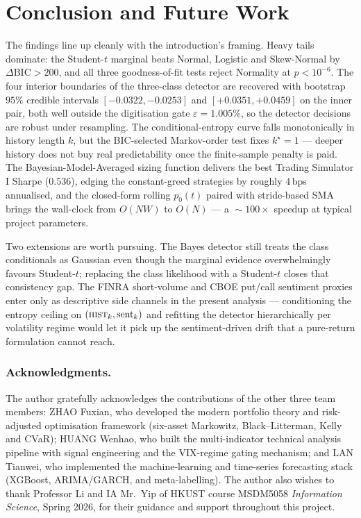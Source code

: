 \documentclass[runningheads]{llncs}
\begin{document}
\section{Conclusion and Future Work}\label{sec:conclusion}

The findings line up cleanly with the introduction's framing. Heavy
tails dominate: the Student-$t$ marginal beats Normal, Logistic and
Skew-Normal by $\Delta\mathrm{BIC}>200$, and all three
goodness-of-fit tests reject Normality at $p<10^{-6}$. The four
interior boundaries of the three-class detector are recovered with
bootstrap $95\%$ credible intervals $[-0.0322,-0.0253]$ and
$[+0.0351,+0.0459]$ on the inner pair, both well outside the
digitisation gate $\varepsilon{=}\num{1.005}\%$, so the detector
decisions are robust under resampling. The conditional-entropy curve
falls monotonically in history length $k$, but the BIC-selected
Markov-order test fixes $k^{\star}{=}1$ --- deeper history does not
buy real predictability once the finite-sample penalty is paid. The
Bayesian-Model-Averaged sizing function delivers the best Trading
Simulator I Sharpe ($\num{0.536}$), edging the constant-greed
strategies by roughly $4$\,bps annualised, and the closed-form
rolling $p_{0}(t)$ paired with stride-based SMA brings the wall-clock
from $O(NW)$ to $O(N)$ --- a $\!\sim\!100\!\times$ speedup at typical
project parameters.

Two extensions are worth pursuing. The Bayes detector still treats
the class conditionals as Gaussian even though the marginal evidence
overwhelmingly favours Student-$t$; replacing the class likelihood
with a Student-$t$ closes that consistency gap. The FINRA
short-volume and CBOE put/call sentiment proxies enter only as
descriptive side channels in the present analysis ---
conditioning the entropy ceiling on $(\textsc{hist}_{k},\mathrm{sent}_{k})$
and refitting the detector hierarchically per volatility regime would
let it pick up the sentiment-driven drift that a pure-return
formulation cannot reach.

\subsubsection*{Acknowledgments.}
The author gratefully acknowledges the contributions of the other three
team members:
ZHAO Fuxian, who developed the modern portfolio theory and risk-adjusted
optimisation framework (six-asset Markowitz, Black--Litterman, Kelly and
CVaR);
HUANG Wenhao, who built the multi-indicator technical analysis pipeline
with signal engineering and the VIX-regime gating mechanism;
and LAN Tianwei, who implemented the machine-learning and time-series
forecasting stack (XGBoost, ARIMA/GARCH, and meta-labelling).
The author also wishes to thank Professor Li and IA Mr.\ Yip of HKUST
course MSDM5058 \emph{Information Science}, Spring 2026, for their
guidance and support throughout this project.



\end{document}
